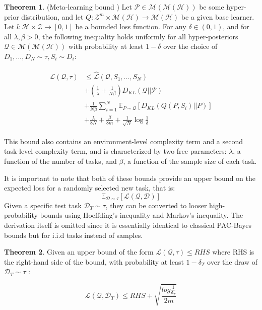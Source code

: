 \documentclass{article}
\theoremstyle{definition}
\newtheorem{theorem}{Theorem}[section]
\newcommand{\Expect}[2]{\mathbb{E}_{#1}\left [#2 \right ]}
\begin{document}
\begin{theorem} (Meta-learning bound \citep{Rothfuss2020}) \label{thm:meta-pb-rothfuss}
	Let $\mathcal{P}\in \mathcal{M}(\mathcal{M}(\mathcal{H}))$ be some hyper-prior distribution, and let $Q: \mathcal{Z}^m\times\mathcal{M}(\mathcal{H})\rightarrow \mathcal{M}(\mathcal{H})$ be a given base learner. Let $l: \mathcal{H}\times \mathcal{Z}\rightarrow [0, 1]$ be a bounded loss function.
	For any $\delta \in (0,1)$, and for all $\lambda, \beta >0$, the following inequality holds uniformly for all hyper-posteriors $\mathcal{Q}\in \mathcal{M}(\mathcal{M}(\mathcal{H}))$ with probability at least $1-\delta$ over the choice of $D_1,...,D_N\sim \tau, S_i\sim D_i$:
	
	\begin{align} \label{eq:meta-pb-rothfuss}
	\begin{split}
	\mathcal{L}(\mathcal{Q}, \tau) &\leq \hat{\mathcal{L}}(\mathcal{Q}, S_1,...,S_N) \\
	&+\left (\frac{1}{\lambda}+\frac{1}{N\beta} \right )D_{KL}(\mathcal{Q}||\mathcal{P}) \\
	&+\frac{1}{N\beta}\sum_{i=1}^{N}\Expect{P\sim \mathcal{Q}}{D_{KL}(Q(P,S_i)||P)} \\
	&+\frac{\lambda}{8N}+\frac{\beta}{8m}+\frac{1}{\sqrt{N}}\log\frac{1}{\delta}
	\end{split}
	\end{align}
	
\end{theorem}

This bound also contains an environment-level complexity term and a second task-level complexity term, and is characterized by two free parameters: $\lambda$, a function of the number of tasks, and $\beta$, a function of the sample size of each task. 

It is important to note that both of these bounds provide an upper bound on the expected loss for a randomly selected new task, that is:
$$\Expect{\mathcal{D}\sim \tau}{\mathcal{L}(\mathcal{Q}, \mathcal{D})}$$
Given a specific test task $\mathcal{D}_T\sim \tau$, they can be converted to looser high-probability bounds using Hoeffding's inequality and Markov's inequality. The derivation itself is omitted since it is essentially identical to classical PAC-Bayes bounds but for i.i.d tasks instead of samples.

\begin{theorem} \label{thm:meta-highprob}
Given an upper bound of the form $\mathcal{L}(\mathcal{Q}, \tau) \leq RHS$ where RHS is the right-hand side of the bound, with probability at least $1-\delta_T$ over the draw of $\mathcal{D}_T\sim \tau$ :

$$ \mathcal{L}(\mathcal{Q}, \mathcal{D}_T) \leq RHS + \sqrt{\frac{log\frac{1}{\delta_T}}{2m}}$$

\end{theorem}
\end{document}
